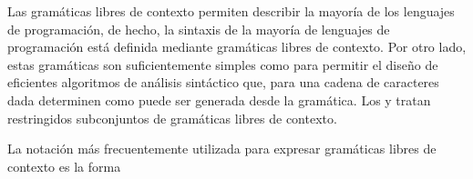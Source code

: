 \documentclass[12pt,a4paper,spanish]{book}
\begin{document}
Las gram\'aticas libres de contexto permiten describir la mayor\'ia de los lenguajes de programaci\'on, de hecho, la sintaxis de la mayor\'ia de lenguajes de programaci\'on est\'a definida mediante gram\'aticas libres de contexto. Por otro lado, estas gram\'aticas son suficientemente simples como para permitir el dise\~no de eficientes algoritmos de an\'alisis sint\'actico que, para una cadena de caracteres dada determinen como puede ser generada desde la gram\'atica. Los  y  tratan restringidos subconjuntos de gram\'aticas libres de contexto.

La notaci\'on m\'as frecuentemente utilizada para expresar gram\'aticas libres de contexto es la forma 
\end{document}
